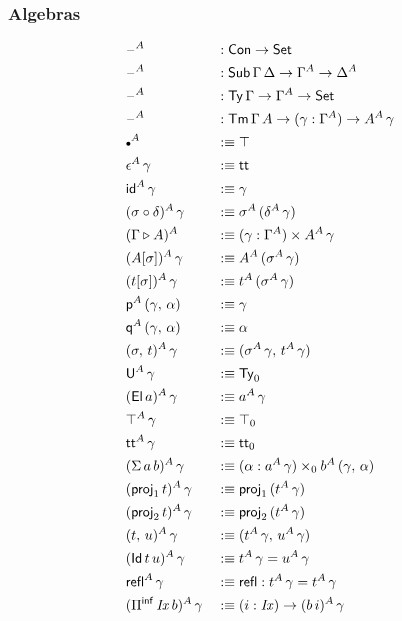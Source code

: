 \documentclass[12pt,a4paper,twoside,openany]{book}
\theoremstyle{remark}
\theoremstyle{definition}
\theoremstyle{theorem}
\newcommand{\mi}[1]{\mathit{#1}}
\newcommand{\refl}{\mathsf{refl}}
\newcommand{\id}{\mathsf{id}}
\newcommand{\Con}{\mathsf{Con}}
\newcommand{\Sub}{\mathsf{Sub}}
\newcommand{\Tm}{\mathsf{Tm}}
\newcommand{\Ty}{\mathsf{Ty}}
\newcommand{\U}{\mathsf{U}}
\newcommand{\El}{\mathsf{El}}
\newcommand{\Id}{\mathsf{Id}}
\newcommand{\proj}{\mathsf{proj}}
\renewcommand{\tt}{\mathsf{tt}}
\newcommand{\blank}{\mathord{\hspace{1pt}\text{--}\hspace{1pt}}}
\newcommand{\Set}{\mathsf{Set}}
\newcommand{\ext}{\triangleright}
\newcommand{\emptycon}{\scaleobj{.75}\bullet}
\newcommand{\Piinf}{\Pi^{\mathsf{inf}}}
\newcommand{\p}{\mathsf{p}}
\newcommand{\q}{\mathsf{q}}
\newcommand{\defn}{:\equiv}
\begin{document}
\subsubsection{Algebras}
\vspace{-0.5em}
\begin{alignat*}{3}
  &\blank^A &&: \Con \to \Set\\
  &\blank^A &&: \Sub\,\Gamma\,\Delta \to \Gamma^A \to \Delta^A\\
  &\blank^A &&: \Ty\,\Gamma \to \Gamma^A \to \Set\\
  &\blank^A &&: \Tm\,\Gamma\,A \to (\gamma : \Gamma^A) \to A^A\,\gamma\\
  &\emptycon^A &&\defn \top\\
  &\epsilon^A\,\gamma &&\defn \tt\\
  &\id^A\,\gamma &&\defn \gamma\\
  &(\sigma \circ \delta)^A\,\gamma &&\defn \sigma^A\,(\delta^A\,\gamma)\\
  &(\Gamma \ext A)^A &&\defn (\gamma : \Gamma^A) \times A^A\,\gamma\\
  &(A[\sigma])^A\,\gamma &&\defn A^A\,(\sigma^A\,\gamma)\\
  &(t[\sigma])^A\,\gamma &&\defn t^A\,(\sigma^A\,\gamma)\\
  &\p^A\,(\gamma,\,\alpha) &&\defn \gamma\\
  &\q^A\,(\gamma,\,\alpha) &&\defn \alpha\\
  &(\sigma,\,t)^A\,\gamma &&\defn (\sigma^A\,\gamma,\,t^A\,\gamma)\\
  &\U^A\,\gamma &&\defn \Ty_0\\
  &(\El\,a)^A\,\gamma &&\defn a^A\,\gamma\\
  &\top^A\,\gamma &&\defn \top_0\\
  &\tt^A\,\gamma &&\defn \tt_0\\
  &(\Sigma\,a\,b)^A\,\gamma &&\defn (\alpha : a^A\,\gamma) \times_0 b^A\,(\gamma,\,\alpha)\\
  &(\proj_1\,t)^A\,\gamma &&\defn \proj_1\,(t^A\,\gamma)\\
  &(\proj_2\,t)^A\,\gamma &&\defn \proj_2\,(t^A\,\gamma)\\
  &(t,\,u)^A\,\gamma &&\defn (t^A\,\gamma,\,u^A\,\gamma)\\
  &(\Id\,t\,u)^A\,\gamma &&\defn t^A\,\gamma = u^A\,\gamma\\
  &\refl^A\,\gamma &&\defn \refl : t^A\,\gamma = t^A\,\gamma\\
  &(\Piinf\,\mi{Ix}\,b)^A\,\gamma &&\defn (i : \mi{Ix}) \to (b\,i)^A\,\gamma\\

\end{alignat*}
\end{document}

